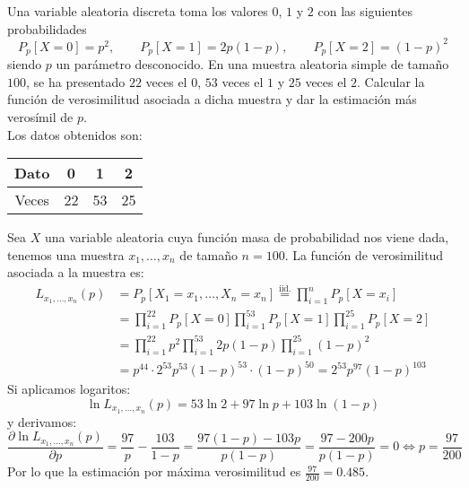 \begin{ejercicio}
    Una variable aleatoria discreta toma los valores $0$, $1$ y $2$ con las siguientes probabilidades
    \begin{equation*}
        P_p[X=0] = p^2, \qquad P_p[X=1] = 2p(1-p), \qquad P_p[X=2] = {(1-p)}^{2}
    \end{equation*}
    siendo $p$ un parámetro desconocido. En una muestra aleatoria simple de tamaño $100$, se ha presentado $22$ veces el $0$, $53$ veces el $1$ y $25$ veces el $2$. Calcular la función de verosimilitud asociada a dicha muestra y dar la estimación más verosímil de $p$.\\

    \noindent
    Los datos obtenidos son:
    \begin{table}[H]
    \centering
    \begin{tabular}{c|ccc}
        Dato & 0 & 1 & 2 \\
        \hline
        Veces & 22 & 53 & 25
    \end{tabular}
    \end{table}
    Sea $X$ una variable aleatoria cuya función masa de probabilidad nos viene dada, tenemos una muestra $x_1, \ldots, x_n$ de tamaño $n=100$. La función de verosimilitud asociada a la muestra es:
    \begin{align*}
        L_{x_1,\ldots,x_n}(p) &= P_p[X_1=x_1, \ldots, X_n = x_n] \stackrel{\text{iid.}}{=}\prod_{i=1}^{n}P_p[X=x_i]\\ 
                              &= \prod_{i=1}^{22}P_p[X=0] \prod_{i=1}^{53}P_p[X=1]\prod_{i=1}^{25}P_p[X=2] \\
                              &= \prod_{i=1}^{22}p^2 \prod_{i=1}^{53}2p(1-p)\prod_{i=1}^{25}{(1-p)}^{2} \\
                              &= p^{44} \cdot 2^{53}p^{53}{(1-p)}^{53} \cdot {(1-p)}^{50} = 2^{53}p^{97}{(1-p)}^{103}
    \end{align*}
    Si aplicamos logaritos:
    \begin{equation*}
        \ln L_{x_1,\ldots,x_n}(p) = 53\ln 2 + 97 \ln p + 103 \ln(1-p)
    \end{equation*}
    y derivamos:
    \begin{equation*}
        \dfrac{\partial \ln L_{x_1,\ldots,x_n}(p)}{\partial p} = \frac{97}{p} - \frac{103}{1-p} = \frac{97(1-p)-103p}{p(1-p)} = \frac{97 - 200p}{p(1-p)} = 0 \Longleftrightarrow p = \frac{97}{200}
    \end{equation*}
    Por lo que la estimación por máxima verosimilitud es $\frac{97}{200} = 0.485$.
\end{ejercicio}

